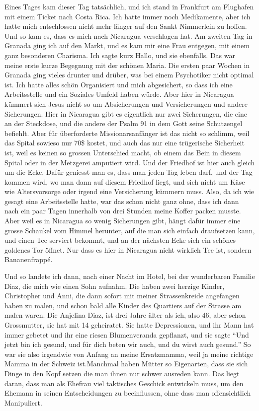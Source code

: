 \documentclass[
]{article}
\begin{document}
Eines Tages kam dieser Tag tatsächlich, und ich stand in Frankfurt am
Flughafen mit einem Ticket nach Costa Rica. Ich hatte immer noch
Medikamente, aber ich hatte mich entschlossen nicht mehr länger auf den
Sankt Nimmerlein zu hoffen. Und so kam es, dass es mich nach Nicaragua
verschlagen hat. Am zweiten Tag in Granada ging ich auf den Markt, und
es kam mir eine Frau entgegen, mit einem ganz besonderen Charisma. Ich
sagte kurz Hallo, und sie ebenfalls. Das war meine erste kurze Begegnung
mit der schönen Maria. Die ersten paar Wochen in Granada ging vieles
drunter und drüber, was bei einem Psychotiker nicht optimal ist. Ich
hatte alles schön Organisiert und mich abgesichert, so dass ich eine
Arbeitsstelle und ein Soziales Umfeld haben würde. Aber hier in
Nicaragua kümmert sich Jesus nicht so um Absicherungen und
Versicherungen und andere Sicherungen. Hier in Nicaragua gibt es
eigentlich nur zwei Sicherungen, die eine an der Steckdose, und die
andere der Psalm 91 in dem Gott seine Schutzengel befiehlt. Aber für
überforderte Missionarsanfänger ist das nicht so schlimm, weil das
Spital sowieso nur 70\$ kostet, und auch das nur eine trügerische
Sicherheit ist, weil es keinen so grossen Unterschied macht, ob einem
das Bein in diesem Spital oder in der Metzgerei amputiert wird. Und der
Friedhof ist hier auch gleich um die Ecke. Dafür geniesst man es, dass
man jeden Tag leben darf, und der Tag kommen wird, wo man dann auf
diesem Friedhof liegt, und sich nicht um Käse wie Altersvorsorge oder
irgend eine Versicherung kümmern muss. Also, da ich wie gesagt eine
Arbeitsstelle hatte, war das schon nicht ganz ohne, dass ich dann nach
ein paar Tagen innerhalb von drei Stunden meine Koffer packen musste.
Aber weil es in Nicaragua so wenig Sicherungen gibt, hängt dafür immer
eine grosse Schaukel vom Himmel herunter, auf die man sich einfach
draufsetzen kann, und einen Tee serviert bekommt, und an der nächsten
Ecke sich ein schönes goldenes Tor öffnet. Nur dass es hier in Nicaragua
nicht wirklich Tee ist, sondern Bananenfrappé.

Und so landete ich dann, nach einer Nacht im Hotel, bei der wunderbaren
Familie Diaz, die mich wie einen Sohn aufnahm. Die haben zwei herzige
Kinder, Christopher und Anni, die dann sofort mit meiner Strassenkreide
angefangen haben zu malen, und schon bald alle Kinder des Quartiers auf
der Strasse am malen waren. Die Anjelina Diaz, ist drei Jahre älter als
ich, also 46, aber schon Grossmutter, sie hat mit 14 geheiratet. Sie
hatte Depressionen, und ihr Mann hat immer gebetet und ihr eine riesen
Blumenveranda gepflanzt, und sie sagte ``Und jetzt bin ich gesund, und
für dich beten wir auch, und du wirst auch gesund.'' So war sie also
irgendwie von Anfang an meine Ersatzmamma, weil ja meine richtige Mamma
in der Schweiz ist.Manchmal haben Mütter so Eigenarten, dass sie sich
Dinge in den Kopf setzen die man ihnen nur schwer ausreden kann. Das
liegt daran, dass man als Ehefrau viel taktisches Geschick entwickeln
muss, um den Ehemann in seinen Entscheidungen zu beeinflussen, ohne dass
man offensichtlich Manipuliert.
\end{document}

